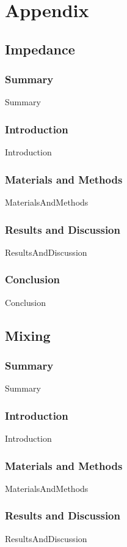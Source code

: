 \documentclass[12pt,a4paper]{article}
\begin{document}
\tableofcontents
	\section{Appendix}
	\subsection{Impedance}
    \subsubsection{Summary}
        {Summary}
    \subsubsection{Introduction}
        {Introduction}
    \subsubsection{Materials and Methods}
        {MaterialsAndMethods}
    \subsubsection{Results and Discussion}
		{ResultsAndDiscussion}
    \subsubsection{Conclusion}
        {Conclusion}
        \pagebreak
    
    \subsection{Mixing}
    \subsubsection{Summary}
        {Summary}
    \subsubsection{Introduction}
        {Introduction}
    \subsubsection{Materials and Methods}
        {MaterialsAndMethods}
    \subsubsection{Results and Discussion}
		{ResultsAndDiscussion}
\end{document}
